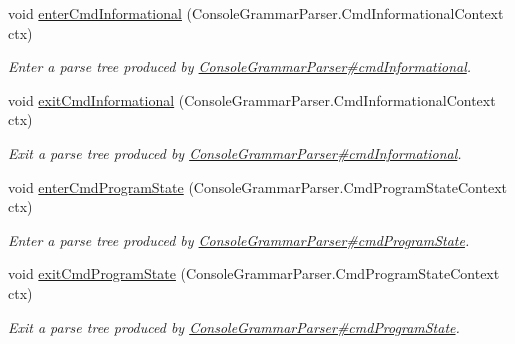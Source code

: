 \begin{DoxyCompactItemize}
void \hyperlink{interfacegov_1_1nasa_1_1jpf_1_1inspector_1_1client_1_1parser_1_1_console_grammar_listener_a4240fdfdbc4ca3ba816303d4e255cc07}{enter\+Cmd\+Informational} (Console\+Grammar\+Parser.\+Cmd\+Informational\+Context ctx)
\begin{DoxyCompactList}\small\item\em Enter a parse tree produced by \hyperlink{classgov_1_1nasa_1_1jpf_1_1inspector_1_1client_1_1parser_1_1_console_grammar_parser_ae35d1b2783eeb9483c0c5473bd4017e4}{Console\+Grammar\+Parser\#cmd\+Informational}. \end{DoxyCompactList}\item 
void \hyperlink{interfacegov_1_1nasa_1_1jpf_1_1inspector_1_1client_1_1parser_1_1_console_grammar_listener_a692e56325396330ba7355a095c251fb7}{exit\+Cmd\+Informational} (Console\+Grammar\+Parser.\+Cmd\+Informational\+Context ctx)
\begin{DoxyCompactList}\small\item\em Exit a parse tree produced by \hyperlink{classgov_1_1nasa_1_1jpf_1_1inspector_1_1client_1_1parser_1_1_console_grammar_parser_ae35d1b2783eeb9483c0c5473bd4017e4}{Console\+Grammar\+Parser\#cmd\+Informational}. \end{DoxyCompactList}\item 
void \hyperlink{interfacegov_1_1nasa_1_1jpf_1_1inspector_1_1client_1_1parser_1_1_console_grammar_listener_a34091c16ab1b91cd294ae1159e9bf0ab}{enter\+Cmd\+Program\+State} (Console\+Grammar\+Parser.\+Cmd\+Program\+State\+Context ctx)
\begin{DoxyCompactList}\small\item\em Enter a parse tree produced by \hyperlink{classgov_1_1nasa_1_1jpf_1_1inspector_1_1client_1_1parser_1_1_console_grammar_parser_ad1e3d393488b8ab29c12899535ecf1cd}{Console\+Grammar\+Parser\#cmd\+Program\+State}. \end{DoxyCompactList}\item 
void \hyperlink{interfacegov_1_1nasa_1_1jpf_1_1inspector_1_1client_1_1parser_1_1_console_grammar_listener_a10a792ce3487dc34eefff8ffb3e9bcc5}{exit\+Cmd\+Program\+State} (Console\+Grammar\+Parser.\+Cmd\+Program\+State\+Context ctx)
\begin{DoxyCompactList}\small\item\em Exit a parse tree produced by \hyperlink{classgov_1_1nasa_1_1jpf_1_1inspector_1_1client_1_1parser_1_1_console_grammar_parser_ad1e3d393488b8ab29c12899535ecf1cd}{Console\+Grammar\+Parser\#cmd\+Program\+State}. \end{DoxyCompactList}\item 

\end{DoxyCompactItemize}
